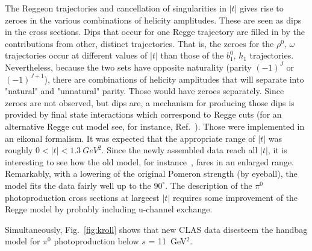 \documentclass[aps,prc,onecolumn,floatfix,showpacs,preprintnumbers,amsmath,amssymb,superscriptaddress]{revtex4-1}
\begin{document}
The Reggeon trajectories and cancellation of singularities in $|t|$ 
gives rise to zeroes in the various combinations of helicity 
amplitudes. These are seen as dips in the cross sections. Dips that 
occur for one Regge trajectory are filled in by the contributions 
from other, distinct trajectories. That is, the zeroes for the 
$\rho^0, \, \omega$ trajectories occur at different values of $|t|$ 
than those of the $b_1^0, \, h_1$ trajectories. Nevertheless, 
because the two sets have opposite naturality (parity $(-1)^J$ or 
$(-1)^{J+1}$), there are combinations of helicity amplitudes that 
will separate into "natural" and "unnatural" parity.  Those would 
have zeroes separately. Since zeroes are not observed, but dips 
are, a mechanism for producing those dips is provided by final 
state interactions which correspond to Regge cuts (for an 
alternative Regge cut model see, for instance, Ref.~\cite{Laget}). 
Those were implemented in an eikonal formalism. It was expected 
that the appropriate range of $|t|$ was roughly $0 < |t| < 
1.3~GeV^2$. Since the newly assembled data reach all $|t|$, it is 
interesting to see how the old model, for instance~\cite{Goldstein}, 
fares in an enlarged range. Remarkably, with a lowering of the 
original Pomeron strength (by eyeball), the model fits the data 
fairly well up to the $90^\circ$.  The description of the $\pi^0$ 
photoproduction cross sections at largeest $|t|$ requires some
improvement of the Regge model by probably including u-channel 
exchange.

Simultaneously, Fig.~\ref{fig:kroll} shows that new CLAS data 
disesteem the handbag model for $\pi^0$ photoproduction below 
$s$ = 11~GeV$^2$.
\end{document}
